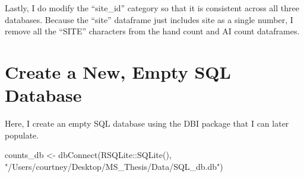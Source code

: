 \documentclass[
]{book}
\newenvironment{Shaded}{\begin{snugshade}}{\end{snugshade}}
\newcommand{\AttributeTok}[1]{\textcolor[rgb]{0.77,0.63,0.00}{#1}}
\newcommand{\ConstantTok}[1]{\textcolor[rgb]{0.00,0.00,0.00}{#1}}
\newcommand{\FunctionTok}[1]{\textcolor[rgb]{0.00,0.00,0.00}{#1}}
\newcommand{\NormalTok}[1]{#1}
\newcommand{\OtherTok}[1]{\textcolor[rgb]{0.56,0.35,0.01}{#1}}
\newcommand{\SpecialCharTok}[1]{\textcolor[rgb]{0.00,0.00,0.00}{#1}}
\newcommand{\StringTok}[1]{\textcolor[rgb]{0.31,0.60,0.02}{#1}}
\begin{document}
Lastly, I do modify the ``site\_id'' category so that it is consistent across all three databases. Because the ``site'' dataframe just includes site as a single number, I remove all the ``SITE'' characters from the hand count and AI count dataframes.

\begin{Shaded}
\end{Shaded}

\hypertarget{create-a-new-empty-sql-database}{%
\section{Create a New, Empty SQL Database}\label{create-a-new-empty-sql-database}}

Here, I create an empty SQL database using the DBI package that I can later populate.

\begin{Shaded}
\begin{Highlighting}[]
\NormalTok{counts\_db }\OtherTok{\textless{}{-}} \FunctionTok{dbConnect}\NormalTok{(RSQLite}\SpecialCharTok{::}\FunctionTok{SQLite}\NormalTok{(), }\StringTok{"/Users/courtney/Desktop/MS\_Thesis/Data/SQL\_db.db"}\NormalTok{)}
\end{Highlighting}
\end{Shaded}
\end{document}
